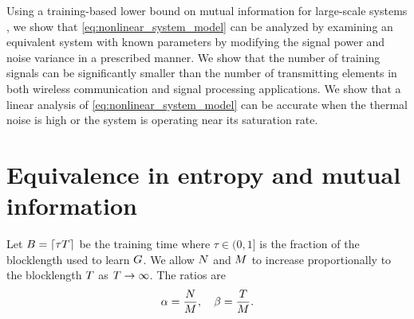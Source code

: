 \documentclass[12pt, draftclsnofoot,journal,onecolumn]{IEEEtran}
\begin{document}
Using a training-based lower bound on mutual information for large-scale systems \cite{gaopart1}, we show that \eqref{eq:nonlinear_system_model} can be analyzed by examining an equivalent system with known parameters by modifying the signal power and noise variance in a prescribed manner.  We show that the number of training signals can be significantly smaller than the number of transmitting elements in both wireless communication and signal processing applications. We show that a linear analysis of \eqref{eq:nonlinear_system_model} can be accurate when the thermal noise is high or the system is operating near its saturation rate.


\section{Equivalence in entropy and mutual information}

Let $B = \lceil{\tau T}\rceil$ be the training time where $\tau\in(0,1]$ is the fraction of the blocklength used to learn $G$. 
We allow $N$ and $M$ to increase proportionally to the blocklength $T$ as $T\to\infty$. 
The ratios are
\begin{align}
    \alpha=\frac{N}{M},\quad \beta=\frac{T}{M}.
    \label{eq:ratios}
\end{align}
\end{document}
